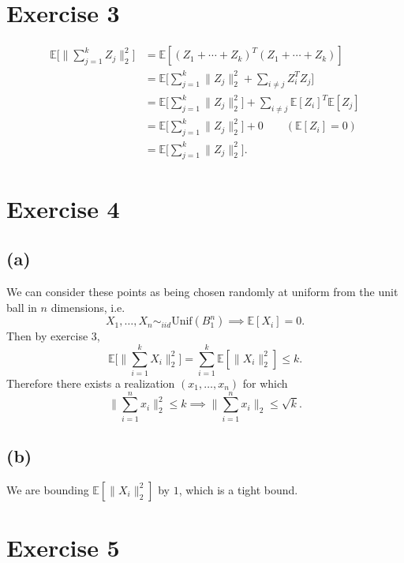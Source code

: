 \newpage
\section*{Exercise 3}
\begin{align*}
	\mathbb{E} \biggl[ \bigg\| \sum_{j = 1}^{k} Z_j \bigg\|_2^2 \biggr] 
	&= \mathbb{E}[(Z_1 + \cdots + Z_k)^T (Z_1 + \cdots + Z_k)] \\
	&= \mathbb{E} \biggl[ \sum_{j = 1}^{k} \|Z_j\|_2^2 + \sum_{i \neq j}^{} Z_i^T Z_j \biggr] \\
	&= \mathbb{E} \biggl[ \sum_{j = 1}^{k} \|Z_j\|_2^2 \biggr] 
	+ \sum_{i \neq j}^{} \mathbb{E}[Z_i]^T \mathbb{E}[Z_j] \\
	&= \mathbb{E} \biggl[ \sum_{j = 1}^{k} \|Z_j\|_2^2 \biggr] + 0 \quad\quad (\mathbb{E}[Z_i] = 0) \\
	&= \mathbb{E} \biggl[ \sum_{j = 1}^{k} \|Z_j\|_2^2 \biggr].
\end{align*}


\newpage
\section*{Exercise 4}
\subsection*{(a)}
We can consider these points as being chosen randomly at uniform from the unit ball in $n$ dimensions, i.e. 
\[ X_1, \dots, X_n \sim_{iid} \text{Unif}(B_1^n) \implies \mathbb{E}[X_i] = 0. \]
Then by exercise 3, 
\[ \mathbb{E} \biggl[ \bigg\| \sum_{i = 1}^{k} X_i \bigg\|_2^2 \biggr] 
= \sum_{i = 1}^{k} \mathbb{E}[\|X_i\|_2^2] \leq k. \]
Therefore there exists a realization $(x_1, \dots, x_n)$ for which 
\[ \bigg\| \sum_{i = 1}^{n} x_i \bigg\|_2^2 \leq k \implies 
\bigg\| \sum_{i = 1}^{n} x_i \bigg\|_2 \leq \sqrt{k}. \]

\subsection*{(b)}
We are bounding $\mathbb{E}[\|X_i\|_2^2]$ by $1$, which is a tight bound.


\newpage
\section*{Exercise 5}


\newpage
